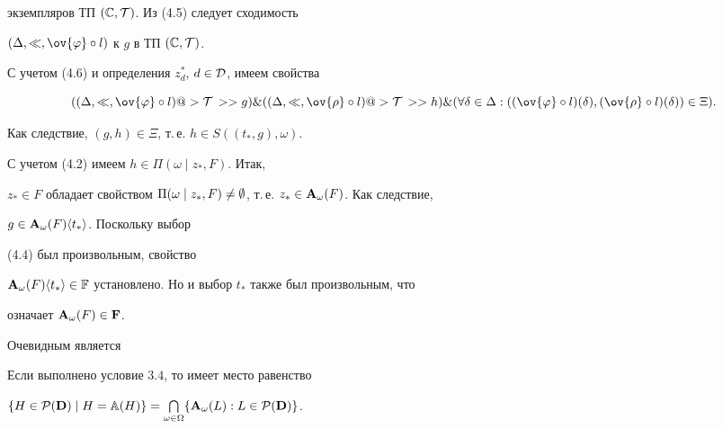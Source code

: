\begin{pf}
экземпляров ТП $({\Bbb C},{\cal T})$. Из (4.5) следует сходимость


$(\Delta,\ll,\ov{\vp} \circ l)$ к $g$ в ТП $({\Bbb C},{\cal T})$.


С учетом (4.6) и определения ${z_d^*}$, $d \in {\cal D}$, имеем свойства


$$


((\Delta,\ll,\ov{\vp} \circ l) @>{\cal T\,}>> g) \&


((\Delta,\ll,\ov{\rho} \circ l) @>{\cal T\,}>> h) \&


(\fo{\delta} \in \Delta:((\ov{\vp} \circ l)(\delta),(\ov{\rho} \circ


l)(\delta)) \in \Xi).


$$


Как следствие, $(g,h) \in \Xi$, т.\,е. $h \in S(({t_*},g),\omega)$.


С учетом (4.2) имеем $h \in {\Pi}(\omega \mid {z_*},F)$. Итак,


${z_*} \in F$ обладает свойством ${\Pi}(\omega \mid {z_*},F) \ne


\emp$, т.\,е. ${z_*} \in {{\bold A}_\omega}(F)$. Как следствие,


$g \in {{\bold A}_\omega}(F)\langle{t_*}\rangle$. Поскольку выбор


(4.4) был произвольным, свойство


${{\bold A}_\omega}(F)\langle{t_*}\rangle \in


{\Bbb F}$ установлено. Но и выбор $t_*$ также был произвольным, что


означает ${{\bold A}_\omega}(F) \in {\bold F}$.


\end{pf}





Очевидным является





\begin{props}


Если выполнено условие $3.4$, то имеет место равенство


$\{H \in {{\cal P}({\bold D})} \mid H = {\Bbb A}(H)\} =


{\bigcap\limits_{\omega \in \Om}}\{{{\bold A}_\omega}(L):L \in


{{\cal P}({\bold D})}\}$.


\end{props}





